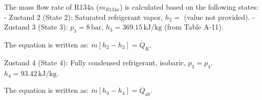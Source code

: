 The mass flow rate of R134a (\( \dot{m}_{R134a} \)) is calculated based on the following states:  
- Zustand 2 (State 2): Saturated refrigerant vapor, \( h_2 = \) (value not provided).  
- Zustand 3 (State 3): \( p_3 = 8 \, \text{bar} \), \( h_3 = 369.15 \, \text{kJ/kg} \) (from Table A-11).  

The equation is written as:  
\( \dot{m} [h_2 - h_3] = \dot{Q}_K \).  

Zustand 4 (State 4): Fully condensed refrigerant, isobaric, \( p_3 = p_4 \).  
\( h_4 = 93.42 \, \text{kJ/kg} \).  

The equation is written as:  
\( \dot{m} [h_3 - h_4] = \dot{Q}_{ab} \).